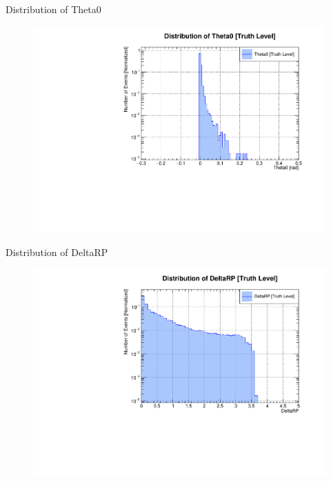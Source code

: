 \begin{frame}{Distribution of Theta0}
	\begin{figure}
		\includegraphics[width=\linewidth]{output/Theta0.pdf}
	\end{figure}
\end{frame}

\begin{frame}{Distribution of DeltaRP}
	\begin{figure}
		\includegraphics[width=\linewidth]{output/DeltaRP.pdf}
	\end{figure}
\end{frame}

